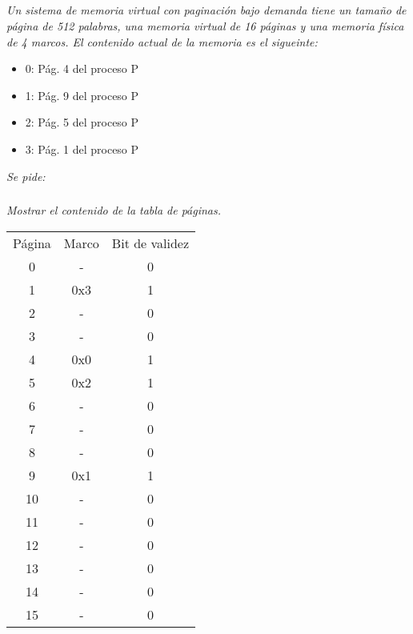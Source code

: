 \documentclass[spanish]{article}
\begin{document}
\subsection{}

\textit{Un sistema de memoria virtual con paginación bajo
demanda tiene un tamaño de página de 512 palabras, una
memoria virtual de 16 páginas y una memoria física de 4
marcos. El contenido actual de la memoria es el sigueinte:}

\begin{center}
\begin{itemize}
\item 0: Pág. 4 del proceso P
\item 1: Pág. 9 del proceso P
\item 2: Pág. 5 del proceso P
\item 3: Pág. 1 del proceso P
\end{itemize}
\end{center}

\textit{Se pide:}

\subsubsection{}

\textit{Mostrar el contenido de la tabla de páginas.}\\

\begin{center}
\begin{tabular}{ | c | c | c | }
Página & Marco & Bit de validez \\
0 & - & 0 \\
1 & 0x3 & 1 \\
2 & - & 0 \\
3 & - & 0 \\
4 & 0x0 & 1 \\
5 & 0x2 & 1 \\
6 & - & 0 \\
7 & - & 0 \\
8 & - & 0 \\
9 & 0x1 & 1 \\
10 & - & 0 \\
11 & - & 0 \\
12 & - & 0 \\
13 & - & 0 \\
14 & - & 0 \\
15 & - & 0 \\
\end{tabular}
\end{center}
\end{document}
